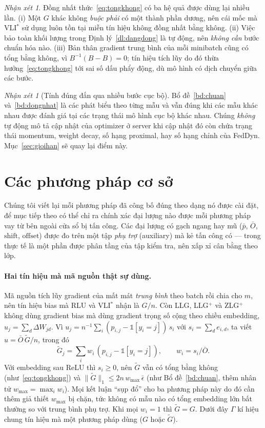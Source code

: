 \documentclass[11pt]{article}
\theoremstyle{remark}
\newtheorem{nhanxet}[dinhly]{Nhận xét}
\begin{document}
\begin{nhanxet}
Đồng nhất thức~\eqref{eq:tongkhong} có ba hệ quả được dùng lại nhiều lần.
(i) Một $G$ khác không \emph{buộc phải} có một thành phần dương, nên cái mốc
mà VLI$^*$ sử dụng luôn tồn tại miễn tín hiệu không đồng nhất bằng không.
(ii) Việc bảo toàn khối lượng trong Định lý~\ref{dl:dangdong} là tự động, nên
\emph{không cần} bước chuẩn hóa nào. (iii) Bản thân gradient trung bình của
mỗi minibatch cũng có tổng bằng không, vì $B^{-1}(B - B) = 0$; tín hiệu tích
lũy do đó thừa hưởng~\eqref{eq:tongkhong} tới sai số dấu phẩy động, dù mô
hình có dịch chuyển giữa các bước.
\end{nhanxet}

\begin{nhanxet}[Tính đúng đắn qua nhiều bước cục bộ]
Bổ đề~\ref{bd:chuan} và~\ref{bd:dongnhat} là các phát biểu theo từng mẫu và
vẫn đúng khi các mẫu khác nhau được đánh giá tại các trạng thái mô hình cục
bộ khác nhau. Chúng \emph{không} tự động mô tả cập nhật của optimizer ở server
khi cập nhật đó còn chứa trạng thái momentum, weight decay, số hạng proximal,
hay số hạng chỉnh của FedDyn. Mục~\ref{sec:gioihan} sẽ quay lại điểm này.
\end{nhanxet}

\section{Các phương pháp cơ sở}
\label{sec:coso}

Chúng tôi viết lại mỗi phương pháp đã công bố đúng theo dạng nó được cài đặt,
để mục tiếp theo có thể chỉ ra chính xác đại lượng nào được mỗi phương pháp
vay từ bên ngoài cửa sổ bị tấn công. Các đại lượng có gạch ngang hay mũ
($\bar p$, $\bar O$, $\mathrm{shift}$, $\mathrm{offset}$) được đo trên một
tập \emph{phụ trợ} (auxiliary) mà kẻ tấn công có --- trong thực tế là một
phần được phân tầng của tập kiểm tra, nên xấp xỉ cân bằng theo lớp.

\paragraph{Hai tín hiệu mà mã nguồn thật sự dùng.}
Mã nguồn tích lũy gradient của mất mát \emph{trung bình} theo batch rồi chia
cho $m$, nên tín hiệu bias mà RLU và VLI$^*$ nhận là $G/n$. Còn LLG,
LLG$^+$ và ZLG$^+$ không dùng gradient bias mà dùng gradient trọng số cộng
theo chiều embedding, $u_j = \sum_d \Delta W_{jd}$. Vì
$u_j = n^{-1}\sum_i (p_{i,j}-\mathbb{1}[y_i=j])\,s_i$ với
$s_i = \sum_d e_{i,d}$, ta viết $u = \bar O\,\tilde G/n$, trong đó
\[
 \tilde G_j = \sum_i w_i\,(p_{i,j} - \mathbb{1}[y_i=j]),
 \qquad w_i = s_i/\bar O .
\]
Với embedding sau ReLU thì $s_i \ge 0$, nên $\tilde G$ vẫn có tổng bằng không
(như~\eqref{eq:tongkhong}) và $\|\tilde G\|_1 \le 2n\,w_{\max}\,\bar\epsilon$
(như Bổ đề~\ref{bd:chuan}, thêm nhân tử $w_{\max} = \max_i w_i$). Mọi kết
luận ``sụp đổ'' cho ba phương pháp này do đó cần thêm giả thiết $w_{\max}$
bị chặn, tức không có mẫu nào có tổng embedding lớn bất thường so với trung
bình phụ trợ. Khi mọi $w_i = 1$ thì $\tilde G = G$. Dưới đây $\Gamma$ kí
hiệu chung tín hiệu mà một phương pháp dùng ($G$ hoặc $\tilde G$).
\end{document}
